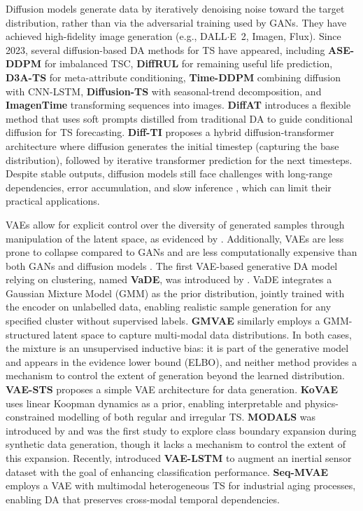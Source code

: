 Diffusion models generate
data by iteratively denoising noise toward the target
distribution, rather than via the adversarial training used by GANs. They have
achieved high-fidelity image generation (e.g., DALL$\cdot$E~2,
Imagen, Flux). Since 2023, several diffusion-based DA methods
for TS have appeared, including \textbf{ASE-DDPM}
\citep{liu2024adaptive} for imbalanced TSC, \textbf{DiffRUL}
\citep{wang2024diffrul} for remaining useful life prediction,
\textbf{D3A-TS} \citep{solis2023} for meta-attribute
conditioning, \textbf{Time-DDPM} \citep{dai2023timeddpm} combining diffusion with
CNN-LSTM, \textbf{Diffusion-TS} \citep{yuandiffusion} with
seasonal-trend decomposition, and \textbf{ImagenTime}
\citep{naiman2024utilizing} transforming sequences into images.
\textbf{DiffAT} \citep{yu2025diffat} introduces a flexible
method that uses soft prompts distilled from traditional DA to
guide conditional diffusion for TS forecasting.
\textbf{Diff-TI} \citep{zhang2025time} proposes a hybrid
diffusion-transformer architecture where diffusion generates the
initial timestep (capturing the base distribution), followed by
iterative transformer prediction for the next timesteps.
Despite stable outputs, diffusion models still face challenges
with long-range dependencies, error accumulation, and slow
inference \citep{feng2024latent}, which can limit their
practical applications.

VAEs allow for explicit control over the
diversity of generated samples through manipulation
of the latent space, as evidenced by \cite{cheung2020modals}. Additionally, VAEs are
less prone to collapse compared to GANs and are less
computationally expensive than both GANs and diffusion models
\citep{thanh2020catastrophic}. The first VAE-based generative DA model relying on clustering,
named \textbf{VaDE}, was introduced by
\cite{jiang2016variational}. VaDE integrates a Gaussian Mixture
Model (GMM) as the prior distribution, jointly trained with the
encoder on unlabelled data, enabling realistic sample generation
for any specified cluster without supervised labels.
\textbf{GMVAE} \citep{dilokthanakul2017gmvae} similarly employs
a GMM-structured latent space to capture multi-modal data
distributions. In both cases, the mixture is an unsupervised
inductive bias: it is part of the generative model and appears
in the evidence lower bound (ELBO), and neither method provides a mechanism to control
the extent of generation beyond the learned distribution. \textbf{VAE-STS} \citep{goubeaud2021using} proposes a simple VAE
architecture for data generation. \textbf{KoVAE}
\citep{naiman2023generative} uses linear Koopman dynamics as a
prior, enabling interpretable and physics-constrained modelling
of both regular and irregular TS. \textbf{MODALS} was
introduced by \cite{cheung2020modals} and was the first study to
explore class boundary expansion during synthetic data
generation, though it lacks a mechanism to control the extent of
this expansion. Recently, \cite{dang2024vae} introduced
\textbf{VAE-LSTM} to augment an inertial sensor dataset with the
goal of enhancing classification performance. \textbf{Seq-MVAE}
\citep{bogojeski2025data} employs a VAE with multimodal
heterogeneous TS for industrial aging processes,
enabling DA that preserves cross-modal temporal dependencies.

